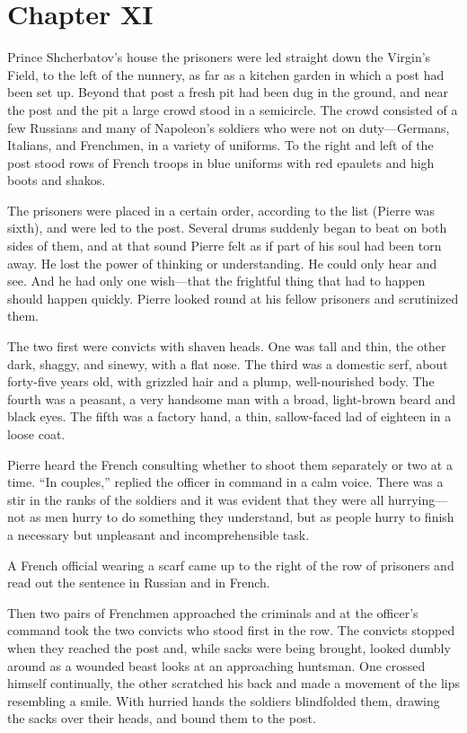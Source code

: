 \chapter*{Chapter XI} \ifaudio {}
\fi

 Prince Shcherbatov's house the prisoners were led straight
down the Virgin's Field, to the left of the nunnery, as far as a
kitchen garden in which a post had been set up. Beyond that post
a fresh pit had been dug in the ground, and near the post and the
pit a large crowd stood in a semicircle. The crowd consisted of a
few Russians and many of Napoleon's soldiers who were not on
duty---Germans, Italians, and Frenchmen, in a variety of
uniforms. To the right and left of the post stood rows of French
troops in blue uniforms with red epaulets and high boots and
shakos.

The prisoners were placed in a certain order, according to the
list (Pierre was sixth), and were led to the post. Several drums
suddenly began to beat on both sides of them, and at that sound
Pierre felt as if part of his soul had been torn away. He lost
the power of thinking or understanding. He could only hear and
see. And he had only one wish---that the frightful thing that had
to happen should happen quickly.  Pierre looked round at his
fellow prisoners and scrutinized them.

The two first were convicts with shaven heads. One was tall and
thin, the other dark, shaggy, and sinewy, with a flat nose. The
third was a domestic serf, about forty-five years old, with
grizzled hair and a plump, well-nourished body. The fourth was a
peasant, a very handsome man with a broad, light-brown beard and
black eyes. The fifth was a factory hand, a thin, sallow-faced
lad of eighteen in a loose coat.

Pierre heard the French consulting whether to shoot them
separately or two at a time. ``In couples,'' replied the officer
in command in a calm voice. There was a stir in the ranks of the
soldiers and it was evident that they were all hurrying---not as
men hurry to do something they understand, but as people hurry to
finish a necessary but unpleasant and incomprehensible task.

A French official wearing a scarf came up to the right of the row
of prisoners and read out the sentence in Russian and in French.

Then two pairs of Frenchmen approached the criminals and at the
officer's command took the two convicts who stood first in the
row. The convicts stopped when they reached the post and, while
sacks were being brought, looked dumbly around as a wounded beast
looks at an approaching huntsman. One crossed himself
continually, the other scratched his back and made a movement of
the lips resembling a smile. With hurried hands the soldiers
blindfolded them, drawing the sacks over their heads, and bound
them to the post.

